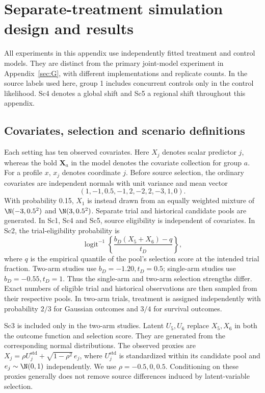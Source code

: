 \section{Separate-treatment simulation design and results}\label{sec:E}
All experiments in this appendix use independently fitted treatment and control models. They are distinct from the primary joint-model experiment in Appendix~\ref{sec:G}, with different implementations and replicate counts. In the source labels used here, group 1 includes concurrent controls only in the control likelihood. Sc4 denotes a global shift and Sc5 a regional shift throughout this appendix.

\subsection{Covariates, selection and scenario definitions}\label{sec:E.1}
Each setting has ten observed covariates. Here $X_j$ denotes scalar predictor $j$, whereas the bold $\mathbf{X}_a$ in the model denotes the covariate collection for group $a$. For a profile $x$, $x_j$ denotes coordinate $j$. Before source selection, the ordinary covariates are independent normals with unit variance and mean vector
\begin{equation}
(1,-1,0.5,-1,2,-2,2,-3,1,0).
\end{equation}
With probability 0.15, $X_1$ is instead drawn from an equally weighted mixture of $\N(-3,0.5^2)$ and $\N(3,0.5^2)$. Separate trial and historical candidate pools are generated. In Sc1, Sc4 and Sc5, source eligibility is independent of covariates. In Sc2, the trial-eligibility probability is
\begin{equation}\label{eq:select}
\operatorname{logit}^{-1}\left\{\frac{b_D(X_5+X_6)-q}{t_D}\right\},
\end{equation}
where $q$ is the empirical quantile of the pool's selection score at the intended trial fraction. Two-arm studies use $b_D=-1.20,t_D=0.5$; single-arm studies use $b_D=-0.55,t_D=1$. Thus the single-arm and two-arm selection strengths differ. Exact numbers of eligible trial and historical observations are then sampled from their respective pools. In two-arm trials, treatment is assigned independently with probability $2/3$ for Gaussian outcomes and $3/4$ for survival outcomes.

Sc3 is included only in the two-arm studies. Latent $U_5,U_6$ replace $X_5,X_6$ in both the outcome function and selection score. They are generated from the corresponding normal distributions. The observed proxies are $X_j=\rho U_j^{\mathrm{std}}+\sqrt{1-\rho^2}\,e_j$, where $U_j^{\mathrm{std}}$ is standardized within its candidate pool and $e_j\sim\N(0,1)$ independently. We use $\rho=-0.5,0,0.5$. Conditioning on these proxies generally does not remove source differences induced by latent-variable selection.

